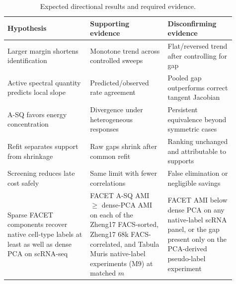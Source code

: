 \begin{table}[t]
\centering
\caption{Expected directional results and required evidence.}
\label{tab:a-expected}
\small
\begin{tabular}{p{0.33\linewidth}p{0.31\linewidth}p{0.27\linewidth}}
\toprule
Hypothesis & Supporting evidence & Disconfirming evidence \\
\midrule
Larger margin shortens identification & Monotone trend across controlled sweeps & Flat/reversed trend after controlling for gap \\
Active spectral quantity predicts local slope & Predicted/observed rate agreement & Pooled gap outperforms correct tangent Jacobian \\
A-SQ favors energy concentration & Divergence under heterogeneous responses & Persistent equivalence beyond symmetric cases \\
Refit separates support from shrinkage & Raw gaps shrink after common refit & Ranking unchanged and attributable to supports \\
Screening reduces late cost safely & Same limit with fewer correlations & False elimination or negligible savings \\
Sparse FACET components recover native cell-type labels at least as well as dense PCA on scRNA-seq & FACET A-SQ AMI $\geq$ dense-PCA AMI on each of the Zheng17 FACS-sorted, Zheng17 68k FACS-correlated, and Tabula Muris native-label experiments (M9) at matched $m$ & FACET AMI below dense PCA on any native-label scRNA panel, or the gap present only on the PCA-derived pseudo-label experiment \\
\bottomrule
\end{tabular}
\end{table}
